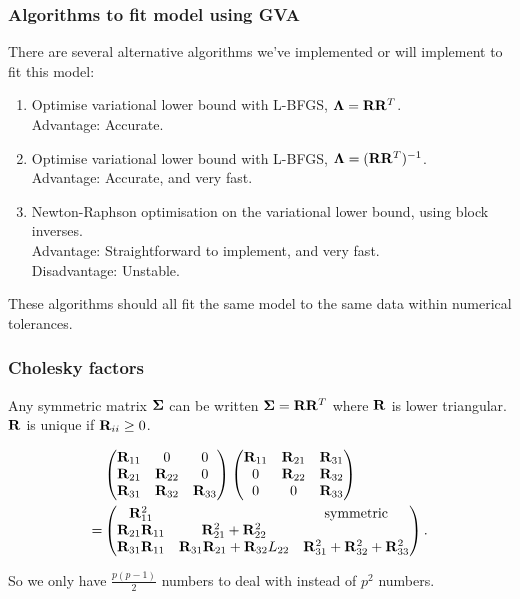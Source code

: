 \documentclass{beamer}
\begin{document}
\begin{frame}
\frametitle{Algorithms to fit model using GVA}
There are several alternative algorithms we've implemented or will implement
to fit this model:
\begin{enumerate}
\item Optimise variational lower bound with L-BFGS, ${\boldsymbol \Lambda} = {\bf R} {\bf R}^T$.\\
\quad Advantage: Accurate.
\item Optimise variational lower bound with L-BFGS, ${\boldsymbol \Lambda} = ({\bf R} {\bf R}^T)^{-1}$. \\
\quad Advantage: Accurate, and very fast.
\item Newton-Raphson optimisation on the variational lower bound, using block inverses. \\
\quad Advantage: Straightforward to implement, and very fast. \\
\quad Disadvantage: Unstable.
\end{enumerate}

These algorithms should all fit the same model to the same data
within numerical tolerances.
\end{frame}

\begin{frame}
\frametitle{Cholesky factors}
Any symmetric matrix ${\boldsymbol \Sigma}$ can be written ${\boldsymbol \Sigma} = {\bf R} {\bf R}^T$
where ${\bf R}$ is lower triangular. ${\bf R}$ is unique if ${\bf R}_{ii} \geq 0$.

\begin{align*}
&\begin{pmatrix}
{\bf R}_{11} & 0 & 0 \\
{\bf R}_{21} & {\bf R}_{22} & 0 \\
{\bf R}_{31} & {\bf R}_{32} & {\bf R}_{33}
\end{pmatrix}
\begin{pmatrix}
{\bf R}_{11} & {\bf R}_{21} & {\bf R}_{31} \\
0 & {\bf R}_{22} & {\bf R}_{32} \\
0 & 0 & {\bf R}_{33}
\end{pmatrix}
\\
=& \begin{pmatrix}
{\bf R}_{11}^2 & & \text{symmetric}\\
{\bf R}_{21}{\bf R}_{11} & {\bf R}_{21}^2 + {\bf R}_{22}^2 \\
{\bf R}_{31} {\bf R}_{11} & {\bf R}_{31}{\bf R}_{21} + {\bf R}_{32}L_{22} & {\bf R}_{31}^2 + {\bf R}_{32} ^2 + {\bf R}_{33}^2
\end{pmatrix}.
\end{align*}

So we only have $\frac{p(p-1)}{2}$ numbers to deal with instead of
$p^2$ numbers.

\end{frame}
\end{document}
